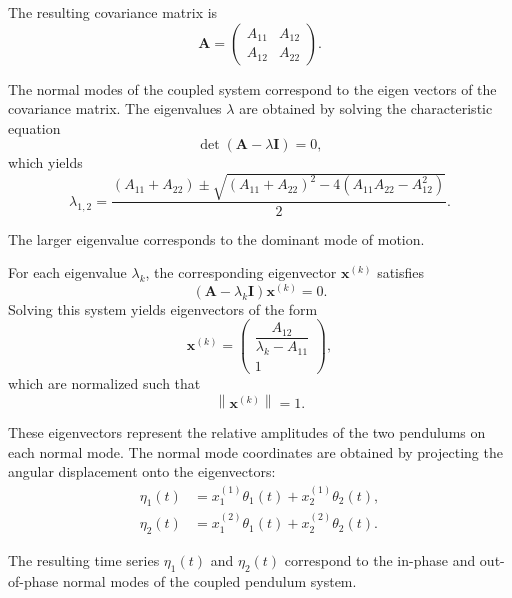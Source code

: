 \documentclass[rc]{physicsinprogress}
\begin{document}
The resulting covariance matrix is 
\begin{equation}
\mathbf{A} =
\begin{pmatrix}
A_{11} & A_{12} \\
A_{12} & A_{22}
\end{pmatrix}.
\end{equation}

The normal modes of the coupled system correspond to the eigen vectors of the covariance matrix. The eigenvalues $\lambda$ are obtained by solving the characteristic equation 
\begin{equation}
\det(\mathbf{A} - \lambda \mathbf{I}) = 0,
\end{equation}
which yields
\begin{equation}
\lambda_{1,2} =
\frac{(A_{11} + A_{22}) \pm
\sqrt{(A_{11} + A_{22})^2 - 4(A_{11}A_{22} - A_{12}^2)}}{2}.
\end{equation}

The larger eigenvalue corresponds to the dominant mode of motion.

For each eigenvalue $\lambda_k$, the corresponding eigenvector $\mathbf{x}^{(k)}$ satisfies
\begin{equation}
(\mathbf{A} - \lambda_k \mathbf{I})\mathbf{x}^{(k)} = 0.
\end{equation}
Solving this system yields eigenvectors of the form
\begin{equation}
\mathbf{x}^{(k)} =
\begin{pmatrix}
\dfrac{A_{12}}{\lambda_k - A_{11}} \\
1
\end{pmatrix},
\end{equation}
which are normalized such that
\begin{equation}
\left\lVert \mathbf{x}^{(k)} \right\rVert = 1.
\end{equation} 

These eigenvectors represent the relative amplitudes of the two pendulums on each normal mode. The normal mode coordinates are obtained by projecting the angular displacement onto the eigenvectors: 
\begin{align}
\eta_1(t) &= x_1^{(1)}\theta_1(t) + x_2^{(1)}\theta_2(t), \\
\eta_2(t) &= x_1^{(2)}\theta_1(t) + x_2^{(2)}\theta_2(t).
\end{align}

The resulting time series $\eta_1(t)$ and $\eta_2(t)$ correspond to the in-phase and out-of-phase normal modes of the coupled pendulum system.
\end{document}

